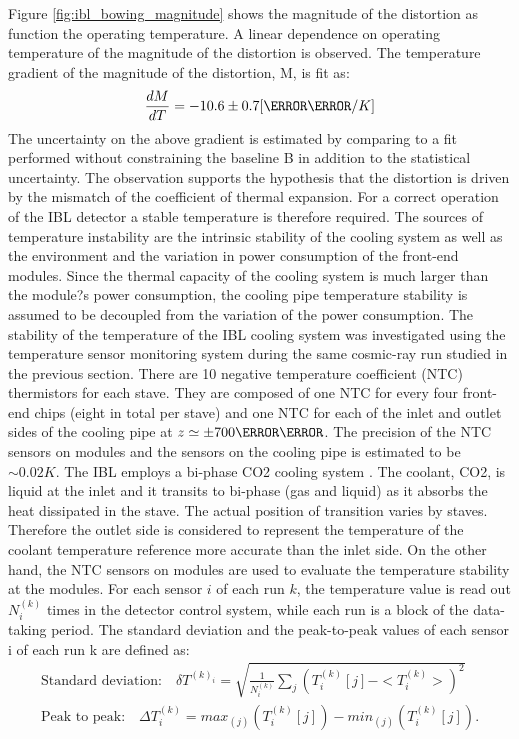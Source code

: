 Figure \ref{fig:ibl_bowing_magnitude} shows the magnitude of the distortion as function the operating temperature. A linear dependence
on operating temperature of the magnitude of the distortion is observed. The temperature gradient of the
magnitude of the distortion, M, is fit as:
\begin{equation}
\frac{dM}{dT} = -10.6 \pm 0.7 [\micro \meter /K]
\end{equation}
The uncertainty on the above gradient is estimated by comparing to a fit performed without constraining
the baseline B in addition to the statistical uncertainty. The observation supports the hypothesis that the
distortion is driven by the mismatch of the coefficient of thermal expansion.
For a correct operation of the IBL detector a stable temperature is therefore required. The sources of temperature instability are the intrinsic stability of the cooling system as well as the environment and the variation in power consumption of the front-end modules.
Since the thermal capacity of the cooling system is much larger than the module?s power consumption,
the cooling pipe temperature stability is assumed to be decoupled from the variation of the power consumption.
The stability of the temperature of the IBL cooling system was investigated using the temperature sensor
monitoring system during the same cosmic-ray run studied in the previous section. There are 10 negative
temperature coefficient (NTC) thermistors for each stave. They are composed of one NTC for every four
front-end chips (eight in total per stave) and one NTC for each of the inlet and outlet sides of the cooling
pipe at $z \simeq \pm 700 \milli \meter$. The precision of the NTC sensors on modules and the sensors on the cooling pipe
is estimated to be $\sim 0.02 K$. The IBL employs a bi-phase CO2 cooling system \cite{ibl_bowing_6}. The coolant, CO2,
is liquid at the inlet and it transits to bi-phase (gas and liquid) as it absorbs the heat dissipated in the stave.
The actual position of transition varies by staves. Therefore the outlet side is considered to represent the
temperature of the coolant temperature reference more accurate than the inlet side. On the other hand, the
NTC sensors on modules are used to evaluate the temperature stability at the modules.
For each sensor $i$ of each run $k$, the temperature value is read out $N^{(k)}_i$ times in the detector control system, while each run is a block of the data-taking period. The standard deviation and the peak-to-peak values
of each sensor i of each run k are defined as:
\begin{equation}
\begin{array}{l}
\text{Standard deviation:}\quad \delta T^{(k)_i} = \sqrt{\frac{1}{N^{(k)}_i} \sum_{j} (T^{(k)}_i[j]-<T^{(k)}_i>)^2}\\
\text{Peak to peak:}\quad \Delta T^{(k)}_i = max_{(j)}(T^{(k)}_i[j]) - min_{(j)}(T^{(k)}_i[j]).
\end{array}
\end{equation}
